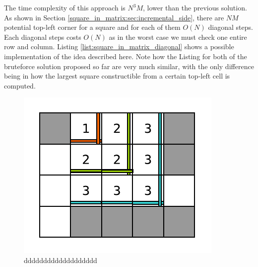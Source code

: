 The time complexity of this approach is $N^3M$, lower than the previous solution. As shown in
Section \ref{square_in_matrix:sec:incremental_side}, there are $NM$ potential top-left corner for a
square and for each of them $O(N)$ diagonal steps. Each diagonal steps costs $O(N)$ as in the worst
case we must check one entire row and column. Listing \ref{list:square_in_matrix_diagonal} shows a
possible implementation of the idea described here. Note how the Listing for both of the bruteforce
solution proposed so far are very much similar, with the only difference being in how the largest
square constructible from a certain top-left cell is computed. 

\begin{figure}
	\centering
	\label{fig:square_in_matrix:square_matrix_diagonal}
	\includegraphics[]{sources/square_in_matrix/images/square_matrix_diagonal}
	\caption{ddddddddddddddddddd }
\end{figure}





